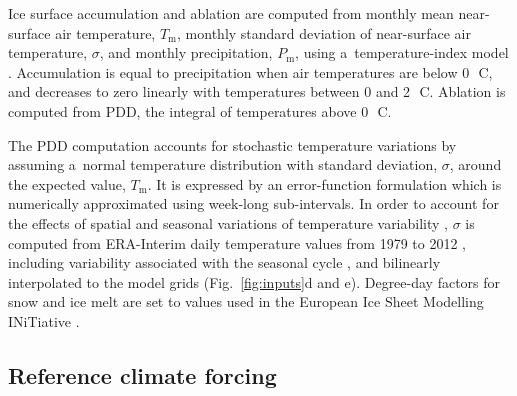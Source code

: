 \documentclass[tc, manuscript]{copernicus}
\begin{document}
    Ice surface accumulation and ablation are computed from monthly mean
    near-surface air temperature, $T_{\mathrm{m}}$, monthly standard deviation
    of near-surface air temperature, $\sigma$, and monthly precipitation,
    $P_{\mathrm{m}}$, using a~temperature-index model
    \citep[e.g.,][]{Hock.2003}. Accumulation is equal to precipitation when air
    temperatures are below 0\,\unit{{\degree}C}, and decreases to zero linearly
    with temperatures between 0 and 2\,\unit{{\degree}C}. Ablation is computed
    from PDD, the integral of temperatures above 0\,\unit{{\degree}C}.

    The PDD computation accounts for stochastic temperature variations by
    assuming a~normal temperature distribution with standard deviation,
    $\sigma$, around the expected value, $T_{\mathrm{m}}$. It is expressed by
    an error-function formulation \citep{Calov.Greve.2005}
    which is numerically approximated using week-long sub-intervals. In
    order to account for the effects of spatial and seasonal variations of
    temperature variability \citep{Seguinot.2013}, $\sigma$ is computed
    from ERA-Interim daily temperature values from 1979 to 2012
    \citep{Mesinger.etal.2006}, including variability associated with the
    seasonal cycle \citep{Seguinot.2013}, and bilinearly interpolated to the
    model grids (Fig.~\ref{fig:inputs}d and e). Degree-day factors for snow and ice
    melt are set to values used in the European Ice Sheet Modelling INiTiative
    \citep[Table~\ref{tab:params}; EISMINT,][]{Huybrechts.1998}.


\subsection{Reference climate forcing}
\label{sec:atm}
\end{document}
